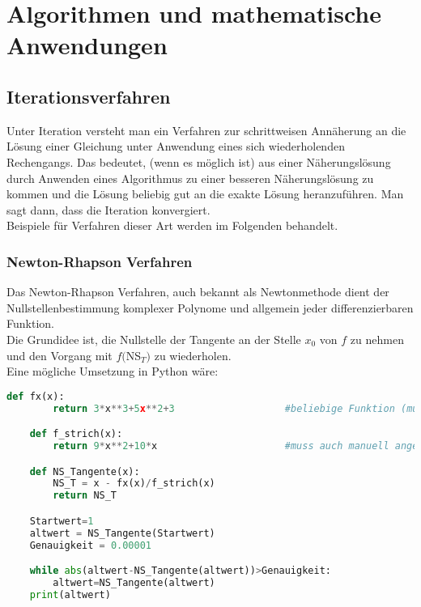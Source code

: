 \documentclass[main.tex]{subfiles}
\begin{document}
\section{Algorithmen und mathematische Anwendungen}
\subsection{Iterationsverfahren}
Unter Iteration versteht man ein Verfahren zur schrittweisen Annäherung an die Lösung einer Gleichung unter Anwendung eines sich wiederholenden Rechengangs. Das bedeutet, (wenn es möglich ist) aus einer Näherungslösung durch Anwenden eines Algorithmus zu einer besseren Näherungslösung zu kommen und die Lösung beliebig gut an die exakte Lösung heranzuführen. Man sagt dann, dass die Iteration konvergiert.\\
Beispiele für Verfahren dieser Art werden im Folgenden behandelt.
\subsubsection{Newton-Rhapson Verfahren}
Das Newton-Rhapson Verfahren, auch bekannt als Newtonmethode dient der Nullstellenbestimmung komplexer Polynome und allgemein jeder differenzierbaren Funktion.\\
Die Grundidee ist, die Nullstelle der Tangente an der Stelle $x_0$ von $f$ zu nehmen und den Vorgang mit $f($NS$_T)$ zu wiederholen.\\
Eine mögliche Umsetzung in Python wäre:\\
\begin{lstlisting}[language=Python]
	def fx(x):
		return 3*x**3+5x**2+3					#beliebige Funktion (muss angegeben werden)

	def f_strich(x):
		return 9*x**2+10*x						#muss auch manuell angegeben werden

	def NS_Tangente(x):
		NS_T = x - fx(x)/f_strich(x)
		return NS_T

	Startwert=1
	altwert = NS_Tangente(Startwert)
	Genauigkeit = 0.00001

	while abs(altwert-NS_Tangente(altwert))>Genauigkeit:
		altwert=NS_Tangente(altwert)
	print(altwert)

\end{lstlisting}
\end{document}

